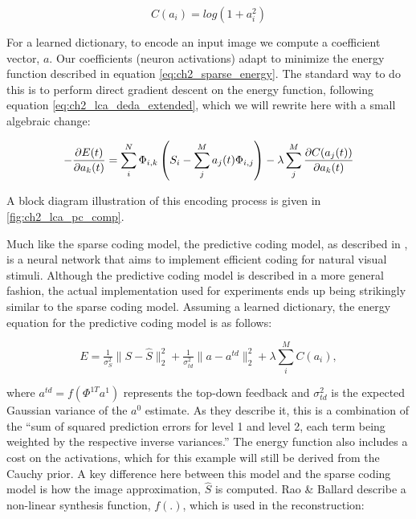 \begin{equation}\label{eq:ch2_cauchy_cost}
  C(a_{i}) = log(1+a_{i}^{2})
\end{equation}

For a learned dictionary, to encode an input image we compute a coefficient vector, $a$. Our coefficients (neuron activations) adapt to minimize the energy function described in equation \eqref{eq:ch2_sparse_energy}. The standard way to do this is to perform direct gradient descent on the energy function, following equation \eqref{eq:ch2_lca_deda_extended}, which we will rewrite here with a small algebraic change:

\begin{equation}\label{eq:ch2_sc_deda_rewrite}
    - \frac{\partial E(t)}{\partial a_{k}(t)}
    =
        \sum\limits_{i}^{N} \Phi_{i,k} \left(S_{i} - \sum\limits_{j}^{M}a_{j}(t) \Phi_{i,j}\right) -
        \lambda \sum\limits_{j}^{M}\frac{\partial C(a_{j}(t))}{\partial a_{k}(t)} \\
\end{equation}

A block diagram illustration of this encoding process is given in \ref{fig:ch2_lca_pc_comp}.

Much like the sparse coding model, the predictive coding model, as described in \parencite{rao1997dynamic, rao1999predictive}, is a neural network that aims to implement efficient coding for natural visual stimuli. Although the predictive coding model is described in a more general fashion, the actual implementation used for experiments ends up being strikingly similar to the sparse coding model. Assuming a learned dictionary, the energy equation for the predictive coding model is as follows:

\begin{equation}\label{eq:ch2_pc_energy_func}
        E =
        \tfrac{1}{\sigma_{S}^{2}} \|S - \hat{S} \|_{2}^{2} +
        \tfrac{1}{\sigma_{td}^{2}} \|a - a^{td}\|_{2}^{2} +
        \lambda \sum\limits_{i}^{M}C(a_{i}),
\end{equation}

where $a^{td} = f\left(\Phi^{1T}a^{1}\right)$ represents the top-down feedback and $\sigma_{td}^2$ is the expected Gaussian variance of the $a^{0}$ estimate. As they describe it, this is a combination of the ``sum of squared prediction errors for level 1 and level 2, each term being weighted by the respective inverse variances.'' The energy function also includes a cost on the activations, which for this example will still be derived from the Cauchy prior. A key difference here between this model and the sparse coding model is how the image approximation, $\hat{S}$ is computed. Rao \& Ballard describe a non-linear synthesis function, $f(.)$, which is used in the reconstruction:

